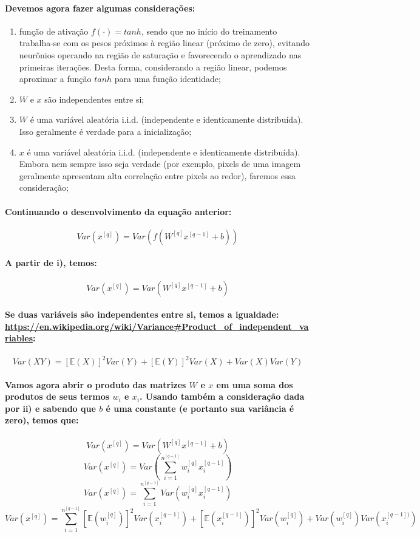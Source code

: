 \documentclass[a4paper]{article}    %
\begin{document}
\paragraph{Devemos agora fazer algumas considerações:}
\begin{enumerate}[label=(\roman*)]
    \item função de ativação $f(\cdot) = tanh$, sendo que no início do treinamento trabalha-se com os pesos próximos à região linear (próximo de zero), evitando neurônios operando na região de saturação e favorecendo o aprendizado nas primeiras iterações. Desta forma, considerando a região linear, podemos aproximar a função $tanh$ para uma função identidade;
    \item $W$ e $x$ são independentes entre si;
    \item $W$ é uma variável aleatória i.i.d. (independente e identicamente distribuída). Isso geralmente é verdade para a inicialização;
    \item $x$ é uma variável aleatória i.i.d. (independente e identicamente distribuída). Embora nem sempre isso seja verdade (por exemplo, pixels de uma imagem geralmente apresentam alta correlação entre pixels ao redor), faremos essa consideração;
\end{enumerate}

\paragraph{Continuando o desenvolvimento da equação anterior:}
\[Var(x^{[q]}) = Var(f(W^{[q]} x^{[q-1]} + b))\]

\paragraph{A partir de i), temos:}
\[Var(x^{[q]}) = Var(W^{[q]} x^{[q-1]} + b)\]

\paragraph{Se duas variáveis são independentes entre si, temos a igualdade:\\
\href{https://en.wikipedia.org/wiki/Variance\#Product_of_independent_variables}{https://en.wikipedia.org/wiki/Variance\#Product\_of\_independent\_variables}:}
\[Var(XY) = [\mathbb{E}(X)]^2 Var(Y) + [\mathbb{E}(Y)]^2 Var(X) + Var(X)Var(Y)\]

\paragraph{Vamos agora abrir o produto das matrizes $W$ e $x$ em uma soma dos produtos de seus termos  $w_i$ e $x_i$. Usando também a consideração dada por ii) e sabendo que $b$ é uma constante (e portanto sua variância é zero), temos que:}
\[Var(x^{[q]}) = Var(W^{[q]} x^{[q-1]} + b)\]
\[Var(x^{[q]}) = Var(\sum_{i=1}^{n^{[q-1]}} w_i^{[q]} x_i^{[q-1]})\]
\[Var(x^{[q]}) = \sum_{i=1}^{n^{[q-1]}} Var(w_i^{[q]} x_i^{[q-1]})\]
\[Var(x^{[q]}) = \sum_{i=1}^{n^{[q-1]}}[\mathbb{E}(w_i^{[q]})]^2 Var(x_i^{[q-1]}) + [\mathbb{E}(x_i^{[q-1]})]^2 Var(w_i^{[q]}) + Var(w_i^{[q]})Var(x_i^{[q-1])})\]
\end{document}
